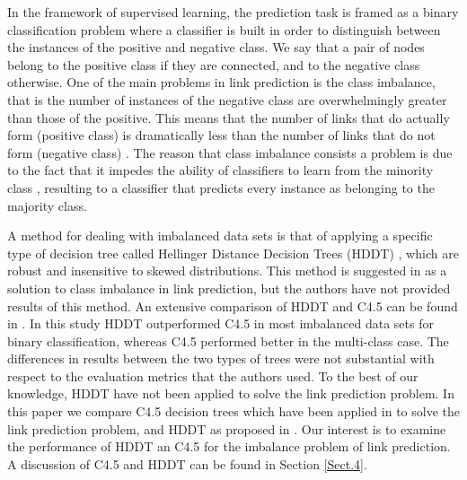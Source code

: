 \documentclass{acm_proc_article-sp}
\begin{document}
In the framework of supervised learning, the prediction task is framed as a binary classification problem where a classifier is built in order to distinguish between the instances of the positive and negative class. We say that a pair of nodes belong to the positive class if they are connected, and to the negative class otherwise. One of the main problems in link prediction is the class imbalance, that is the number of instances of the negative class are overwhelmingly greater than those of the positive. This means that the number of links that do actually form (positive class) is dramatically less than the number of links that do not form (negative class) \cite{Lichtenwalter:2010:NPM:1835804.1835837}. The reason that class imbalance consists a problem is due to the fact that it impedes the ability of classifiers to learn from the minority class \cite{Cieslak2012}, resulting to a classifier that predicts every instance as belonging to the majority class. 
 
A method for dealing with imbalanced data sets is that of applying a specific type of decision tree called Hellinger Distance Decision Trees (HDDT) \cite{Cieslak2008, Cieslak2012}, which are robust and insensitive to skewed distributions. This method is suggested in \cite{Lichtenwalter:2010:NPM:1835804.1835837} as a solution to class imbalance in link prediction, but the authors have not provided results of this method. An extensive comparison of HDDT and C4.5 can be found in \cite{Cieslak2012}. In this study HDDT outperformed C4.5 in most imbalanced data sets for binary classification, whereas C4.5 performed better in the multi-class case. The differences in results between the two types of trees were not substantial with respect to the evaluation metrics that the authors used. To the best of our knowledge, HDDT have not been applied to solve the link prediction problem. In this paper we compare C4.5 decision trees \cite{quinlan2014c4} which have been applied in \cite{Hasan06linkprediction} to solve the link prediction problem, and HDDT as proposed in \cite{Lichtenwalter:2010:NPM:1835804.1835837}. Our interest is to examine the performance of HDDT an C4.5 for the imbalance problem of link prediction. A discussion of C4.5 and HDDT can be found in Section \ref{Sect.4}. 

\end{document}
